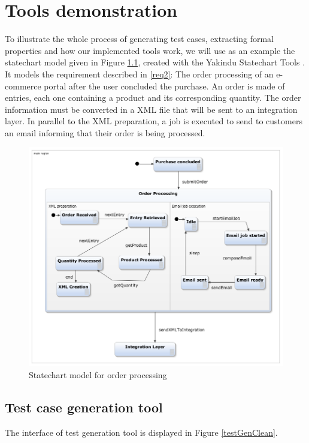 \chapter{Tools demonstration}
\label{cap:casestudy}

To illustrate the whole process of generating test cases, extracting formal properties and how our implemented tools work, we will use as an example the statechart model given in Figure \ref{webOrderProc}, created with the Yakindu Statechart Tools \cite{Yakindu}. It models the requirement described in \ref{req2}: The order processing of an e-commerce portal after the user concluded the purchase. An order is made of entries, each one containing a product and its corresponding quantity. The order information must be converted in a XML file that will be sent to an integration layer. In parallel to the XML preparation, a job is executed to send to customers an email informing that their order is being processed.

\begin{figure}[htb]
\centering
\includegraphics[width=15cm]{figuras/webOrderProc}
\caption{\label{webOrderProc}Statechart model for order processing}
\end{figure}

\section{Test case generation tool}

The interface of test generation tool is displayed in Figure \ref{testGenClean}.

